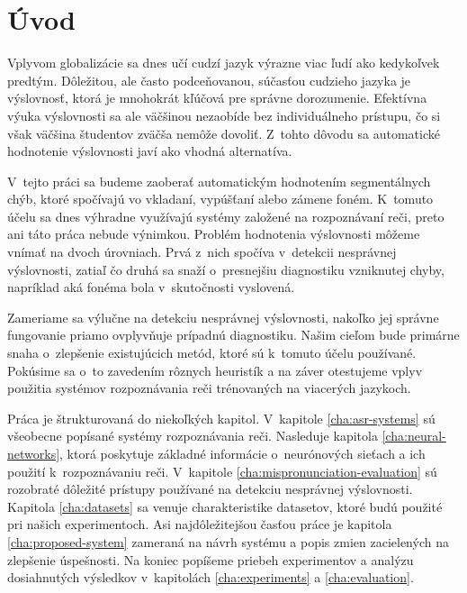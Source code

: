 \chapter{Úvod}

Vplyvom globalizácie sa dnes učí cudzí jazyk výrazne viac ľudí ako kedykoľvek predtým. Dôležitou, ale často podceňovanou, súčasťou cudzieho jazyka je  výslovnosť, ktorá je mnohokrát kľúčová pre správne dorozumenie. Efektívna výuka výslovnosti sa ale väčšinou nezaobíde bez individuálneho prístupu, čo si však väčšina študentov zväčša nemôže dovoliť. Z~tohto dôvodu sa automatické hodnotenie výslovnosti javí ako vhodná alternatíva. 

V~tejto práci sa budeme zaoberať automatickým hodnotením segmentálnych chýb, ktoré spočívajú vo vkladaní, vypúšťaní alebo zámene foném. K~tomuto účelu sa dnes výhradne využívajú systémy založené na rozpoznávaní reči, preto ani táto práca nebude výnimkou. Problém hodnotenia výslovnosti môžeme vnímať na dvoch úrovniach. Prvá z~nich spočíva v~detekcii nesprávnej výslovnosti, zatiaľ čo druhá sa snaží o~presnejšiu diagnostiku vzniknutej chyby, napríklad aká fonéma bola v~skutočnosti vyslovená. 

Zameriame sa výlučne na detekciu nesprávnej výslovnosti, nakoľko jej správne fungovanie priamo ovplyvňuje prípadnú diagnostiku. Našim cieľom bude primárne snaha o~zlepšenie existujúcich metód, ktoré sú k~tomuto účelu používané. Pokúsime sa o~to zavedením rôznych heuristík a na záver otestujeme vplyv použitia systémov rozpoznávania reči trénovaných na viacerých jazykoch.

Práca je štrukturovaná do niekoľkých kapitol. V~kapitole \ref{cha:asr-systems} sú všeobecne popísané systémy rozpoznávania reči. Nasleduje kapitola \ref{cha:neural-networks}, ktorá poskytuje základné informácie o~neurónových sieťach a ich použití k~rozpoznávaniu reči. V~kapitole \ref{cha:mispronunciation-evaluation} sú rozobraté dôležité prístupy používané na detekciu nesprávnej výslovnosti. Kapitola \ref{cha:datasets} sa venuje charakteristike datasetov, ktoré budú použité pri našich experimentoch. Asi najdôležitejšou časťou práce je kapitola \ref{cha:proposed-system} zameraná na návrh systému a popis zmien zacielených na zlepšenie úspešnosti. Na koniec popíšeme priebeh experimentov a analýzu dosiahnutých výsledkov v~kapitolách \ref{cha:experiments} a \ref{cha:evaluation}. 

